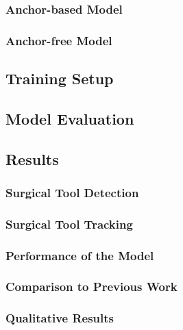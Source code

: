 \subsubsection{Anchor-based Model}

\subsubsection{Anchor-free Model}

\subsection{Training Setup}

\subsection{Model Evaluation}


\subsection{Results}


\subsubsection{Surgical Tool Detection}



\subsubsection{Surgical Tool Tracking}



\subsubsection{Performance of the Model}




\subsubsection{Comparison to Previous Work}

\subsubsection{Qualitative Results}

